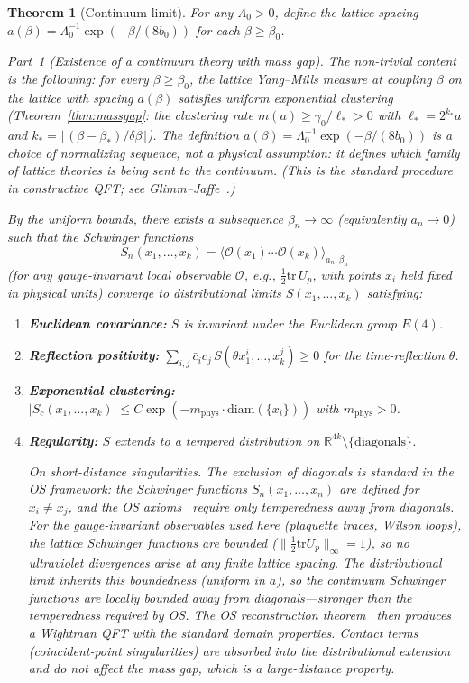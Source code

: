 \documentclass[11pt]{article}
\newtheorem{theorem}{Theorem}[section]
\theoremstyle{definition}
\newcommand{\tr}{\mathrm{tr}}
\newcommand{\R}{\mathbb{R}}
\begin{document}
\begin{theorem}[Continuum limit]\label{thm:continuum}
For any $\Lambda_0>0$, define the lattice spacing
$a(\beta)=\Lambda_0^{-1}\exp(-\beta/(8b_0))$
for each $\beta\ge\beta_0$.

\emph{Part~1 (Existence of a continuum theory with mass gap).}
The non-trivial content is the following:
for every $\beta\ge\beta_0$, the lattice Yang--Mills measure
at coupling $\beta$ on the lattice with spacing
$a(\beta)$ satisfies uniform exponential clustering
(Theorem~\ref{thm:massgap}: the clustering rate
$m(a)\ge\gamma_0/\ell_*>0$ with $\ell_*=2^{k_*}a$
and $k_*=\lfloor(\beta-\beta_*)/\delta\beta\rfloor$).
The definition $a(\beta)=\Lambda_0^{-1}\exp(-\beta/(8b_0))$
is a \emph{choice of normalizing sequence}, not a physical
assumption: it defines which family of lattice theories
is being sent to the continuum.  (This is the standard
procedure in constructive QFT; see
Glimm--Jaffe~\cite{GlimmJaffe}.)

By the uniform bounds, there exists a subsequence
$\beta_n\to\infty$ (equivalently $a_n\to 0$) such that
the Schwinger functions
\[
S_n(x_1,\ldots,x_k)=\langle\mathcal{O}(x_1)\cdots\mathcal{O}(x_k)
\rangle_{a_n,\beta_n}
\]
(for any gauge-invariant local observable $\mathcal{O}$, e.g.,
$\frac{1}{2}\tr\,U_p$, with points $x_i$ held fixed in physical
units) converge to distributional limits $S(x_1,\ldots,x_k)$
satisfying:
\begin{enumerate}[nosep,label=(\roman*)]
\item \textbf{Euclidean covariance:} $S$ is invariant under the
Euclidean group $E(4)$.
\item \textbf{Reflection positivity:}
$\sum_{i,j}\bar c_i c_j\,S(\theta x_1^i,\ldots,x_k^j)\ge 0$
for the time-reflection $\theta$.
\item \textbf{Exponential clustering:}
$|S_c(x_1,\ldots,x_k)|\le C\exp(-m_{\mathrm{phys}}\cdot
\mathrm{diam}(\{x_i\}))$ with $m_{\mathrm{phys}}>0$.
\item \textbf{Regularity:} $S$ extends to a tempered distribution
on $\R^{4k}\setminus\{\text{diagonals}\}$.

\emph{On short-distance singularities.}
The exclusion of diagonals is standard in the OS framework:
the Schwinger functions $S_n(x_1,\ldots,x_n)$ are defined
for $x_i\ne x_j$, and the OS axioms~\cite{OS73} require
only temperedness away from diagonals.  For the gauge-invariant
observables used here (plaquette traces, Wilson loops),
the lattice Schwinger functions are \emph{bounded}
($\|\frac{1}{2}\tr U_p\|_\infty=1$), so no ultraviolet
divergences arise at any finite lattice spacing.
The distributional limit inherits this boundedness
(uniform in $a$), so the continuum Schwinger functions
are locally bounded away from diagonals---stronger than
the temperedness required by OS.
The OS reconstruction theorem~\cite{OS73} then produces
a Wightman QFT with the standard domain properties.
Contact terms (coincident-point singularities) are
absorbed into the distributional extension and do not
affect the mass gap, which is a large-distance property.
\end{enumerate}


\end{theorem}
\end{document}
